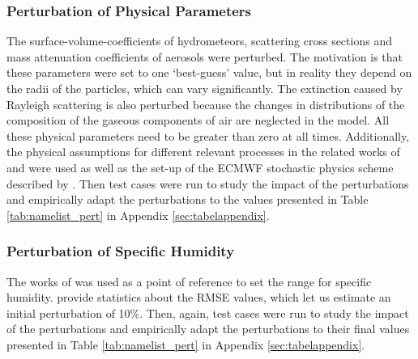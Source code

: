 \subsubsection{Perturbation of Physical Parameters}
The surface-volume-coefficients of hydrometeors, scattering cross sections and  mass attenuation coefficients of aerosols were perturbed. The motivation is that these parameters were set to one `best-guess' value, but in reality  they depend on the radii of the particles, which can vary significantly. The extinction caused by Rayleigh scattering is also perturbed because the changes in distributions of the composition of the gaseous components of air are neglected in the model. All these physical parameters need to be greater than zero at all times. Additionally, the physical assumptions for different relevant processes in the related works of \citeauthor{stoelinga1999nonhydrostatic} \cite{stoelinga1999nonhydrostatic} and \citeauthor{tegen1997contribution} \cite{tegen1997contribution} were used as well as the set-up of the ECMWF stochastic physics scheme described by \citeauthor{ollinaho2017towards} \cite{ollinaho2017towards}. Then test cases were run to study the impact of the perturbations and empirically adapt the perturbations to the values presented in Table \ref{tab:namelist_pert} in Appendix \ref{sec:tabelappendix}. 
\subsubsection{Perturbation of Specific Humidity}
 The works of \citeauthor{Stensrud} \cite{Stensrud} was used as a point of reference to set the range for specific humidity. \citeauthor{Stensrud} provide statistics about the RMSE values, which let us estimate an initial perturbation of 10\%. Then, again, test cases were run to study the impact of the perturbations and empirically adapt the perturbations to their final values presented in Table \ref{tab:namelist_pert} in Appendix \ref{sec:tabelappendix}. 